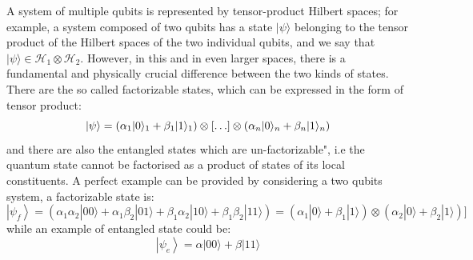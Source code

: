 A system of multiple qubits is represented by tensor-product Hilbert spaces; for example, a system composed of two qubits has a state
$|\psi\rangle$ belonging to the tensor product of the Hilbert spaces of the two individual qubits, and we say that $|\psi\rangle \in \mathcal{H}_1 \otimes \mathcal{H}_2$. However, in this and in even larger spaces, there is a fundamental and physically crucial difference between the two kinds of states. There are the so called factorizable states, which can be expressed in the form of tensor product: 
\begin{equation*}
    \ket{\psi} = \left(\alpha_{1}|0\rangle_{1}+\beta_{1}|1\rangle_{1}\right) \otimes[\ldots] \otimes\left(\alpha_{n}|0\rangle_{n}+\beta_{n}|1\rangle_{n}\right)
\end{equation*}
and there are also the  entangled states which are un-factorizable", i.e the quantum state cannot be factorised as a product of states of its local constituents. 
A perfect example can be provided by considering a two qubits system, a factorizable state is: 
$$
\left|\psi_{f}\right\rangle=(\alpha_1\alpha_2|00\rangle+\alpha_1\beta_2|01\rangle+\beta_1\alpha_2|10\rangle+\beta_1\beta_2|11\rangle)=(\alpha_1|0\rangle+\beta_1|1\rangle) \otimes(\alpha_2|0\rangle+\beta_2|1\rangle)]
$$
while an example of entangled state could be:
$$
\left|\psi_{e}\right\rangle=\alpha|00\rangle+\beta|11\rangle
$$




